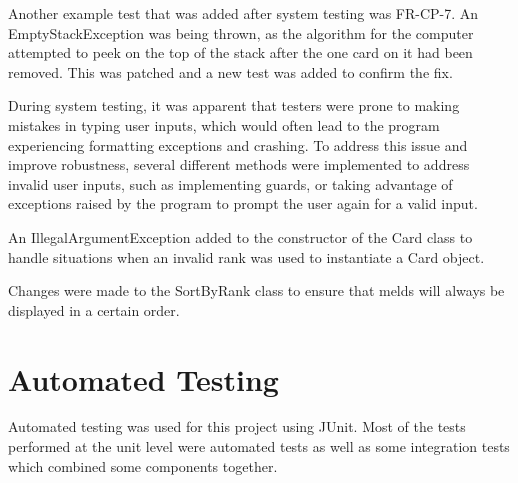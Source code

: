 \documentclass[12pt, titlepage]{article}
\begin{document}
Another example test that was added after system testing was FR-CP-7. An EmptyStackException was being thrown, as the algorithm for the computer attempted to peek on the top of the stack after the one card on it had been removed. This was patched and a new test was added to confirm the fix.

During system testing, it was apparent that testers were prone to making mistakes in typing user inputs, which would often lead to the program experiencing formatting exceptions and crashing. To address this issue and improve robustness, several different methods were implemented to address invalid user inputs, such as implementing guards, or taking advantage of exceptions raised by the program to prompt the user again for a valid input.

An IllegalArgumentException added to the constructor of the Card class to handle situations when an invalid rank was used to instantiate a Card object. 

Changes were made to the SortByRank class to ensure that melds will always be displayed in a certain order.

\section{Automated Testing}
Automated testing was used for this project using JUnit. Most of the tests performed at the unit level were automated tests as well as some integration tests which combined some components together. 
\end{document}
